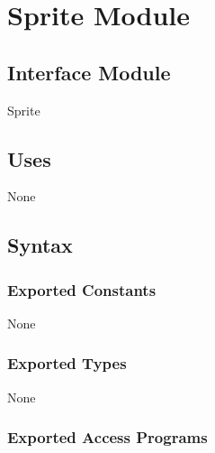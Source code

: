 \documentclass[12pt]{article}
\begin{document}
\newpage









\section* {Sprite Module}

\subsection*{Interface Module}

Sprite

\subsection* {Uses}

None

\subsection* {Syntax}

\subsubsection* {Exported Constants}

None

\subsubsection* {Exported Types}

None 

\subsubsection* {Exported Access Programs}
\end{document}
